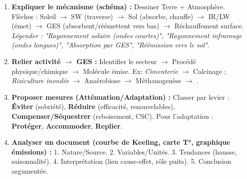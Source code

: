 \documentclass[11pt]{article}
\begin{document}
\begin{methode}
\begin{enumerate}
    \item \textbf{Expliquer le m\'ecanisme (sch\'ema) :} Dessiner Terre + Atmosph\`ere. Fl\`eches : Soleil $\to$ SW (traverse) $\to$ Sol (absorbe, chauffe) $\to$ IR/LW (\'emet) $\to$ GES (absorbent/r\'e\'emettent vers bas) $\to$ R\'echauffement surface. \emph{L\'egender : "Rayonnement solaire (ondes courtes)", "Rayonnement infrarouge (ondes longues)", "Absorption par GES", "R\'e\'emission vers le sol"}.
    \item \textbf{Relier activit\'e $\to$ GES :} Identifier le secteur $\to$ Proc\'ed\'e physique/chimique $\to$ Mol\'ecule \'emise. Ex: \textit{Cimenterie} $\to$ Calcinage  ; \textit{Riziculture inond\'ee} $\to$ Ana\'erobiose $\to$ M\'ethanogen\`ese $\to$ .
    \item \textbf{Proposer mesures (Att\'enuation/Adaptation) :} Classer par levier : \textbf{\'Eviter} (sobri\'et\'e), \textbf{R\'eduire} (efficacit\'e, renouvelables), \textbf{Compenser/S\'equestrer} (reboisement, CSC). Pour l'adaptation : \textbf{Prot\'eger}, \textbf{Accommoder}, \textbf{Replier}.
    \item \textbf{Analyser un document (courbe de Keeling, carte T°, graphique \'emissions) :} 1. Nature/Source. 2. Variables/Unit\'es. 3. Tendances (hausse, saisonnalit\'e). 4. Interpr\'etation (lien cause-effet, r\^ole puits). 5. Conclusion argument\'ee.
\end{enumerate}
\end{methode}
\end{document}
